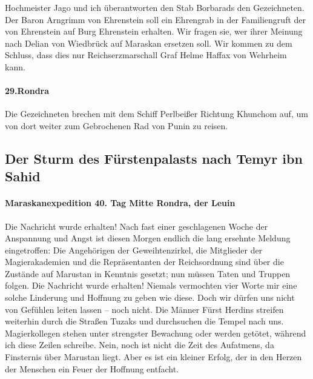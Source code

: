 Hochmeister Jago und ich überantworten den Stab Borbarads den Gezeichneten. Der Baron Arngrimm von Ehrenstein soll ein Ehrengrab in der Familiengruft der von Ehrenstein auf Burg Ehrenstein erhalten. Wir fragen sie, wer ihrer Meinung nach Delian von Wiedbrück auf Maraskan ersetzen soll. Wir kommen zu dem Schluss, dass dies nur Reichserzmarschall Graf Helme Haffax von Wehrheim kann.

\paragraph{29.Rondra}
Die Gezeichneten brechen mit dem Schiff Perlbeißer Richtung Khunchom auf, um von dort weiter zum Gebrochenen Rad von Punin zu reisen.

\subsection{Der Sturm des Fürstenpalasts nach Temyr ibn Sahid}

\paragraph{Maraskanexpedition 40. Tag Mitte Rondra, der Leuin}
Die Nachricht wurde erhalten! Nach fast einer geschlagenen Woche der Anspannung und Angst ist diesen Morgen endlich die lang ersehnte Meldung eingetroffen: Die Angehörigen der Geweihtenzirkel, die Mitglieder der Magierakademien und die Repräsentanten der Reichsordnung sind über die Zustände auf Marustan in Kenntnis gesetzt; nun müssen Taten und Truppen folgen. Die Nachricht wurde erhalten! Niemals vermochten vier Worte mir eine solche Linderung und Hoffnung zu geben wie diese. Doch wir dürfen uns nicht von Gefühlen leiten lassen -- noch nicht. Die Männer Fürst Herdins streifen weiterhin durch die Straßen Tuzaks und durchsuchen die Tempel nach uns. Magierkollegen stehen unter strengster Bewachung oder werden getötet, während ich diese Zeilen schreibe. Nein, noch ist nicht die Zeit des Aufatmens, da Finsternis über Marustan liegt. Aber es ist ein kleiner Erfolg, der in den Herzen der Menschen ein Feuer der Hoffnung entfacht.

